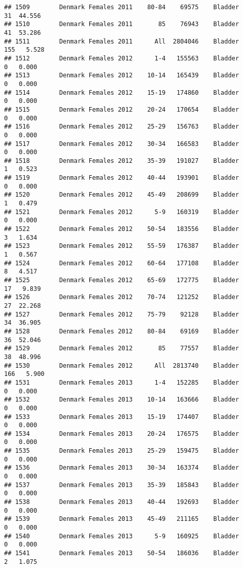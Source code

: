 \documentclass[
]{article}
\begin{document}
\begin{verbatim}
## 1509        Denmark Females 2011    80-84    69575    Bladder     31  44.556
## 1510        Denmark Females 2011       85    76943    Bladder     41  53.286
## 1511        Denmark Females 2011      All  2804046    Bladder    155   5.528
## 1512        Denmark Females 2012      1-4   155563    Bladder      0   0.000
## 1513        Denmark Females 2012    10-14   165439    Bladder      0   0.000
## 1514        Denmark Females 2012    15-19   174860    Bladder      0   0.000
## 1515        Denmark Females 2012    20-24   170654    Bladder      0   0.000
## 1516        Denmark Females 2012    25-29   156763    Bladder      0   0.000
## 1517        Denmark Females 2012    30-34   166583    Bladder      0   0.000
## 1518        Denmark Females 2012    35-39   191027    Bladder      1   0.523
## 1519        Denmark Females 2012    40-44   193901    Bladder      0   0.000
## 1520        Denmark Females 2012    45-49   208699    Bladder      1   0.479
## 1521        Denmark Females 2012      5-9   160319    Bladder      0   0.000
## 1522        Denmark Females 2012    50-54   183556    Bladder      3   1.634
## 1523        Denmark Females 2012    55-59   176387    Bladder      1   0.567
## 1524        Denmark Females 2012    60-64   177108    Bladder      8   4.517
## 1525        Denmark Females 2012    65-69   172775    Bladder     17   9.839
## 1526        Denmark Females 2012    70-74   121252    Bladder     27  22.268
## 1527        Denmark Females 2012    75-79    92128    Bladder     34  36.905
## 1528        Denmark Females 2012    80-84    69169    Bladder     36  52.046
## 1529        Denmark Females 2012       85    77557    Bladder     38  48.996
## 1530        Denmark Females 2012      All  2813740    Bladder    166   5.900
## 1531        Denmark Females 2013      1-4   152285    Bladder      0   0.000
## 1532        Denmark Females 2013    10-14   163666    Bladder      0   0.000
## 1533        Denmark Females 2013    15-19   174407    Bladder      0   0.000
## 1534        Denmark Females 2013    20-24   176575    Bladder      0   0.000
## 1535        Denmark Females 2013    25-29   159475    Bladder      0   0.000
## 1536        Denmark Females 2013    30-34   163374    Bladder      0   0.000
## 1537        Denmark Females 2013    35-39   185843    Bladder      0   0.000
## 1538        Denmark Females 2013    40-44   192693    Bladder      0   0.000
## 1539        Denmark Females 2013    45-49   211165    Bladder      0   0.000
## 1540        Denmark Females 2013      5-9   160925    Bladder      0   0.000
## 1541        Denmark Females 2013    50-54   186036    Bladder      2   1.075

\end{verbatim}
\end{document}
